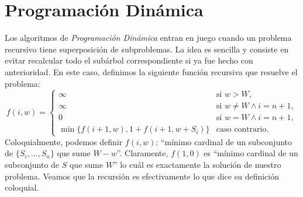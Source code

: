 \documentclass[10pt,a4paper]{article}
\begin{document}
\section{Programación Dinámica} \label{sec:dp}
Los algoritmos de \emph{Programación Dinámica} entran en juego cuando un problema recursivo tiene superposición de subproblemas. La idea es sencilla y consiste en evitar recalcular todo el subárbol correspondiente si ya fue hecho con anterioridad. En este caso, definimos la siguiente función recursiva que resuelve el problema:
\begin{equation} \label{eq:dp}
    f(i, w) = \begin{cases}
        \infty & \text{si } w > W,\\
        \infty & \text{si } w \neq W \land i = n+1,\\
        0 & \text{si } w = W \land i = n+1,\\
        \min \{ f(i+1, w), 1 + f(i+1, w + S_i) \} & \text{caso contrario. }
    \end{cases}
\end{equation}
Coloquialmente, podemos definir $f(i, w)$: ``mínimo cardinal de un subconjunto de $\{S_i, \hdots, S_n\}$ que sume $W-w$''. Claramente, $f(1, 0)$ es ``mínimo cardinal de un subconjunto de $S$ que sume $W$'' lo cuál es exactamente la solución de nuestro problema. Veamos que la recursión es efectivamente lo que dice su definición coloquial.
\end{document}

